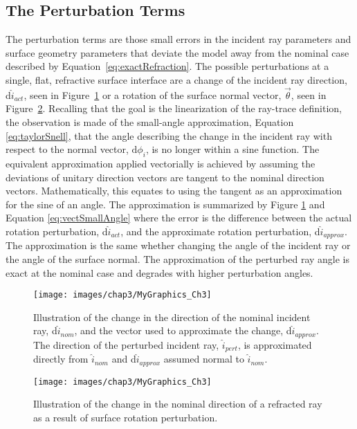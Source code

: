 \subsection{The Perturbation Terms}
\label{sec:thePerturbations}
The perturbation terms are those small errors in the incident ray parameters and surface geometry parameters that deviate the model away from the nominal case described by Equation~\eqref{eq:exactRefraction}. The possible perturbations at a single, flat, refractive surface interface are a change of the incident ray direction, d$\hat{i}_{act}$, seen in Figure~\ref{fig:vectSmallAngle} or a rotation of the surface normal vector, $\vec{\theta}$, seen in Figure~\ref{fig:surfaceRotate}. Recalling that the goal is the linearization of the ray-trace definition, the observation is made of the small-angle approximation, Equation \eqref{eq:taylorSnell}, that the angle describing the change in the incident ray with respect to the normal vector, $\textrm{d}\phi_i$, is no longer within a sine function. The equivalent approximation applied vectorially is achieved by assuming the deviations of unitary direction vectors are tangent to the nominal direction vectors. Mathematically, this equates to using the tangent as an approximation for the sine of an angle. The approximation is summarized by Figure \ref{fig:vectSmallAngle} and Equation \eqref{eq:vectSmallAngle} where the error is the difference between the actual rotation perturbation, d$\hat{i}_{act}$, and the approximate rotation perturbation, d$\hat{i}_{approx}$. The approximation is the same whether changing the angle of the incident ray or the angle of the surface normal. The approximation of the perturbed ray angle is exact at the nominal case and degrades with higher perturbation angles.

\begin{figure}[htb]		%
\centering
\texttt{[image: images/chap3/MyGraphics\_Ch3]}
\caption{Illustration of the change in the direction of the nominal incident ray, d$\hat{i}_{nom}$, and the vector used to approximate the change, d$\hat{i}_{approx}$. The direction of the perturbed incident ray, $\hat{i}_{pert}$, is approximated directly from $\hat{i}_{nom}$ and d$\hat{i}_{approx}$ assumed normal to $\hat{i}_{nom}$.}
\label{fig:vectSmallAngle}
\end{figure}

\begin{figure}		%
\centering
\texttt{[image: images/chap3/MyGraphics\_Ch3]}
\caption{Illustration of the change in the nominal direction of a refracted ray as a result of surface rotation perturbation.}
\label{fig:surfaceRotate}
\end{figure}

